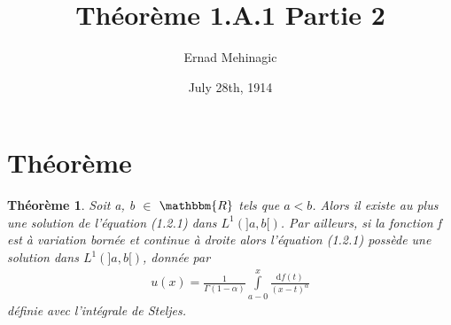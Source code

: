 \documentclass[french]{article}
\title{Théorème 1.A.1 Partie 2}
\author{Ernad Mehinagic}
\date{July 28th, 1914}
\begin{document}
\maketitle
\section{Théorème}
\newtheorem{theorem}{Théorème}
\begin{theorem}
  Soit a, b $\in$ $\mathbbm{R}$ tels que $a<b$. Alors il existe au plus une
  solution de l'équation (1.2.1) dans $L^1(]a,b[)$. Par ailleurs, si la fonction f
  est à variation bornée et continue à droite alors l'équation (1.2.1) possède
  une solution dans $L^1(]a,b[)$, donnée par
  \begin{align}
    u(x)=\frac{1}{\Gamma(1-\alpha)}\int\limits_{a-0}^{x}\frac{\mathrm{d}f(t)}{(x-t)^\alpha}
  \end{align}
  définie avec l'intégrale de Steljes.
\end{theorem}
\end{document}
